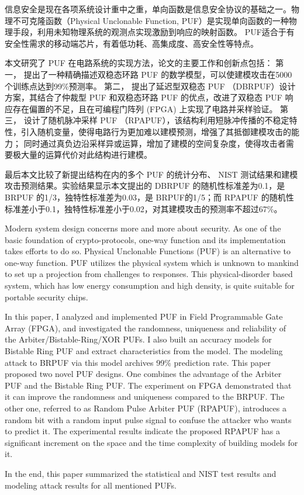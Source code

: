 
\begin{cabstract}
信息安全是现在各项系统设计重中之重，单向函数是信息安全协议的基础之一。物理不可克隆函数（Physical Unclonable Function, PUF）是实现单向函数的一种物理手段，利用未知物理系统的观测点实现激励到响应的映射函数。
PUF适合于有安全性需求的移动端芯片，有着低功耗、高集成度、高安全性等特点。

本文研究了 PUF 在电路系统的实现方法，论文的主要工作和创新点包括：
第一，
提出了一种精确描述双稳态环路 PUF 的数学模型，可以使建模攻击在5000个训练点达到99\%预测率。
第二，
提出了延迟型双稳态 PUF （DBRPUF）设计方案，其结合了仲裁型 PUF 和双稳态环路 PUF 的优点，改进了双稳态 PUF 响应存在偏置的不足，且在可编程门阵列 (FPGA) 上实现了电路并采样验证。
第三，
设计了随机脉冲采样 PUF （RPAPUF），该结构利用短脉冲传播的不稳定特性，引入随机变量，使得电路行为更加难以建模预测，增强了其抵御建模攻击的能力；
同时通过真负边沿采样异或运算，增加了建模的空间复杂度，使得攻击者需要极大量的运算代价对此结构进行建模。

最后本文比较了新提出结构在内的多个 PUF 的统计分布、 NIST 测试结果和建模攻击预测结果。实验结果显示本文提出的 DBRPUF 的随机性标准差为0.1，是 BRPUF 的1/3，独特性标准差为0.03，是 BRPUF的1/5；而 RPAPUF 的随机性标准差小于0.1，独特性标准差小于0.02，对其建模攻击的预测率不超过67\%。
	
\end{cabstract}

\begin{eabstract}
Modern system design concerns more and more about security. As one of the basic foundation of crypto-protocols, one-way function and its implementation takes efforts to do so. Physical Unclonable Functions (PUF) is an alternative to one-way function. PUF utilizes the physical system which is unknown to mankind to set up a projection from challenges to responses. This physical-disorder based system, which has low energy consumption and high density, is quite suitable for portable security chips.

In this paper, I analyzed and implemented PUF in Field Programmable Gate Array (FPGA), and investigated the randomness, uniqueness and reliability of the Arbiter/Bistable-Ring/XOR PUFs.
I also built an accuracy models for Bistable Ring PUF and extract characteristics from the model. The modeling attack to BRPUF via this model archives 99\% prediction rate.
This paper proposed two novel PUF designs. One combines the advantage of the Arbiter PUF and the Bistable Ring PUF. The experiment on FPGA demonstrated that it can improve the randomness and uniqueness compared to the BRPUF.
The other one, referred to as Random Pulse Arbiter PUF (RPAPUF), introduces a random bit with a random input pulse signal to confuse the attacker who wants to predict it. The experimental results indicate the proposed RPAPUF has a significant increment on the space and the time complexity of building models for it.

In the end, this paper summarized the statistical and NIST test results and modeling attack results for all mentioned PUFs.

\end{eabstract}


